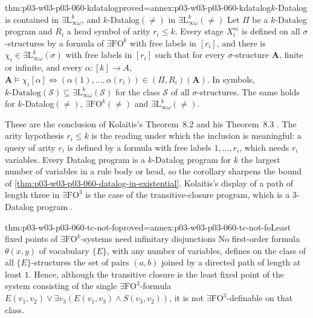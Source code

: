 \begin{hbcorollary}{thm:p03-w03-p03-060-kdatalog}{proved=annex:p03-w03-p03-060-kdatalog}{\(k\)-Datalog is contained in \(\exists\mathrm{L}^k_{\infty\omega}\), and \(k\)-Datalog\((\neq)\) in \(\exists\mathrm{L}^k_{\infty\omega}(\neq)\)}
Let \(\Pi\) be a \(k\)-Datalog program and \(R_i\) a head symbol of arity
\(r_i\le k\). Every stage \(X^m_i\) is defined on all \(\sigma\)-structures
by a formula of \(\exists\mathrm{FO}^k\) with free labels in \([r_i]\), and
there is \(\chi_i\in\exists\mathrm{L}^k_{\infty\omega}(\sigma)\) with free
labels in \([r_i]\) such that for every \(\sigma\)-structure \(\mathbf A\),
finite or infinite, and every \(\alpha\colon[k]\to A\),
\(\mathbf A\models\chi_i[\alpha]\iff(\alpha(1),\ldots,\alpha(r_i))\in(\Pi,R_i)(\mathbf A)\).
In symbols, \(k\text{-Datalog}(\mathcal S)\subseteq\exists\mathrm{L}^k_{\infty\omega}(\mathcal S)\)
for the class \(\mathcal S\) of all \(\sigma\)-structures. The same holds
for \(k\)-Datalog\((\neq)\), \(\exists\mathrm{FO}^k(\neq)\) and
\(\exists\mathrm{L}^k_{\infty\omega}(\neq)\).
\end{hbcorollary}

These are the conclusion of Kolaitis's Theorem~8.2 and his Theorem~8.3
\cite[pp.~70--71]{Kolaitis2003ExpressivePowerNotes}. The arity
hypothesis \(r_i\le k\) is the reading under which the inclusion is
meaningful: a query of arity \(r_i\) is defined by a formula with free
labels \(1,\ldots,r_i\), which needs \(r_i\) variables. Every Datalog
program is a \(k\)-Datalog program for \(k\) the largest number of
variables in a rule body or head, so the corollary sharpens the bound of
\cref{thm:p03-w03-p03-060-datalog-in-existential}. Kolaitis's display of a
path of length three in \(\exists\mathrm{FO}^3\) is the case of the
transitive-closure program, which is a \(3\)-Datalog program
\cite[p.~70]{Kolaitis2003ExpressivePowerNotes}.

\begin{hblemma}{thm:p03-w03-p03-060-tc-not-fo}{proved=annex:p03-w03-p03-060-tc-not-fo}{Least fixed points of \(\exists\mathrm{FO}^k\)-systems need infinitary disjunctions}
No first-order formula \(\theta(x,y)\) of vocabulary \(\{E\}\), with any
number of variables, defines on the class of all \(\{E\}\)-structures the
set of pairs \((a,b)\) joined by a directed path of length at least
\(1\). Hence, although the transitive closure is the least fixed point of
the system consisting of the single \(\exists\mathrm{FO}^3\)-formula
\(E(v_1,v_2)\vee\exists v_3(E(v_1,v_3)\wedge S(v_3,v_2))\), it is not
\(\exists\mathrm{FO}^3\)-definable on that class.
\end{hblemma}

